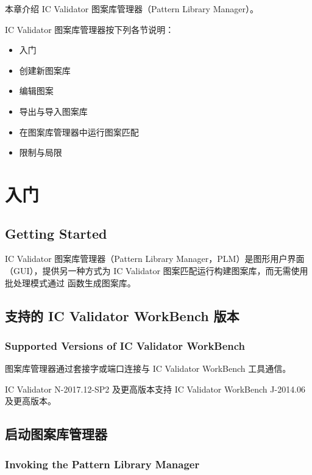 \label{chap:plm}

本章介绍 IC Validator 图案库管理器（Pattern Library Manager）。

IC Validator 图案库管理器按下列各节说明：
\begin{itemize}
  \item 入门
  \item 创建新图案库
  \item 编辑图案
  \item 导出与导入图案库
  \item 在图案库管理器中运行图案匹配
  \item 限制与局限
\end{itemize}

\section{入门}
\subsection*{Getting Started}

IC Validator 图案库管理器（Pattern Library Manager，PLM）是图形用户界面（GUI），提供另一种方式为 IC Validator 图案匹配运行构建图案库，而无需使用批处理模式通过  函数生成图案库。

\subsection{支持的 IC Validator WorkBench 版本}
\subsubsection*{Supported Versions of IC Validator WorkBench}

图案库管理器通过套接字或端口连接与 IC Validator WorkBench 工具通信。

IC Validator N-2017.12-SP2 及更高版本支持 IC Validator WorkBench J-2014.06 及更高版本。

\subsection{启动图案库管理器}
\subsubsection*{Invoking the Pattern Library Manager}


